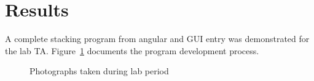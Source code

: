 \section{Results}\label{sec:results}
A complete stacking program from angular and GUI entry was demonstrated for the lab TA.
Figure~\ref{fig:lab-photos} documents the program development process.

\begin{figure}[htpb]
  \centering
  \caption{Photographs taken during lab period}
  \label{fig:lab-photos}
\end{figure}
